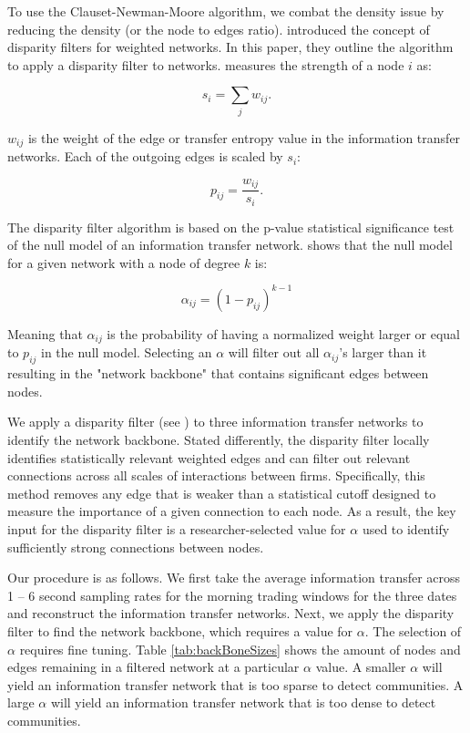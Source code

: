 To use the Clauset-Newman-Moore algorithm, we combat the density issue by reducing the density (or the node to edges ratio).  \cite{Serrano} introduced the concept of disparity filters for weighted networks.  In this paper, they outline the algorithm to apply a disparity filter to networks.  \cite{Serrano} measures the strength of a node \(i\) as:

\begin{equation}
s_i = \sum_j w_{ij}.
\end{equation}

\noindent \(w_{ij}\) is the weight of the edge or transfer entropy value in the information transfer networks.  Each of the outgoing edges is scaled by \(s_i\): 

\begin{equation}
p_{ij} = \frac{w_{ij}}{s_i}.
\end{equation}

\noindent The disparity filter algorithm is based on the p-value statistical significance test of the null model of an information transfer network. \cite{Serrano} shows that the null model for a given network with a node of degree \(k\) is:

\begin{equation}
\alpha_{ij} = (1 - p_{ij})^{k-1}
\end{equation}

\noindent Meaning that \(\alpha_{ij}\) is the probability of having a normalized weight larger or equal to \(p_{ij}\) in the null model.  Selecting an \(\alpha\) will filter out all \(\alpha_{ij}\)'s larger than it resulting in the "network backbone" that contains significant edges between nodes.

We apply a disparity filter (see \cite{Serrano}) to three information transfer networks to identify the network backbone.  Stated differently,  the disparity filter locally identifies statistically relevant weighted edges and can filter out relevant connections across all scales of interactions between firms.  Specifically, this method removes any edge that is weaker than a statistical cutoff designed to measure the importance of a given connection to each node.  As a result, the key input for the disparity filter is a researcher-selected value for \(\alpha \) used to identify sufficiently strong connections between nodes. 

Our procedure is as follows. We first take the average information transfer across 1 – 6 second sampling rates for the morning trading windows for the three dates and reconstruct the information transfer networks.  Next, we apply the disparity filter to find the network backbone, which requires a value for \(\alpha\). The selection of \(\alpha\) requires fine tuning.  Table \ref{tab:backBoneSizes} shows the amount of nodes and edges remaining in a filtered network at a particular  \(\alpha\) value.  A smaller \(\alpha\) will yield an information transfer network that is too sparse to detect communities. A large \(\alpha\) will yield an information transfer network that is too dense to detect communities. 

